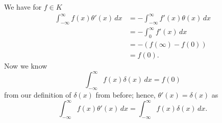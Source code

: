 \begin{solution}
    We have for $f \in K$
    \begin{align*}
        \int_{-\infty}^{\infty} f(x) \theta'(x) \,dx
        &= -\int_{-\infty}^{\infty} f'(x) \theta(x) \,dx \\
        &= -\int_0^{\infty} f'(x) \,dx \\
        &= -(f(\infty) - f(0)) \\
        &= f(0).
    \end{align*}
    Now we know
    \[
        \int_{-\infty}^{\infty} f(x) \delta(x) \,dx = f(0)
    \]
    from our definition of $\delta(x)$ from before;
    hence, $\theta'(x) = \delta(x)$ as
    \[
        \int_{-\infty}^{\infty} f(x) \theta'(x) \,dx 
        = \int_{-\infty}^{\infty} f(x) \delta(x) \,dx.
    \]
\end{solution}
